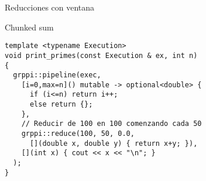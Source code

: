 \begin{frame}[t,fragile]{Reducciones con ventana}
\begin{block}{Chunked sum}
\begin{lstlisting}
template <typename Execution>
void print_primes(const Execution & ex, int n)
{
  grppi::pipeline(exec,
    [i=0,max=n]() mutable -> optional<double> {
      if (i<=n) return i++;
      else return {};
    },
    // Reducir de 100 en 100 comenzando cada 50
    grppi::reduce(100, 50, 0.0,
      [](double x, double y) { return x+y; }),
    [](int x) { cout << x << "\n"; }
  );
}
\end{lstlisting}
\end{block}
\end{frame}
